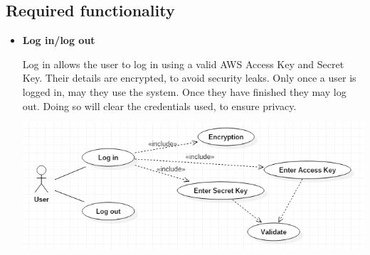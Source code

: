 \documentclass[a4paper,12pt]{report}
\begin{document}
\subsection{Required functionality}
\begin{itemize}
	\item \textbf{Log in/log out}
		\begin{flushleft}
		Log in allows the user to log in using a valid AWS Access Key and Secret Key. Their details are encrypted, to avoid security leaks. Only once a user is logged in, may they use the system. Once they have finished they may log out. Doing so will clear the credentials used, to ensure privacy.
		\end{flushleft}
		\begin{center}
  	 	\includegraphics[width=1\textwidth] {./Diagrams/LoginUseCase.png}\\[0.4cm]    
		\end{center}
	\newpage


\end{itemize}
\end{document}
